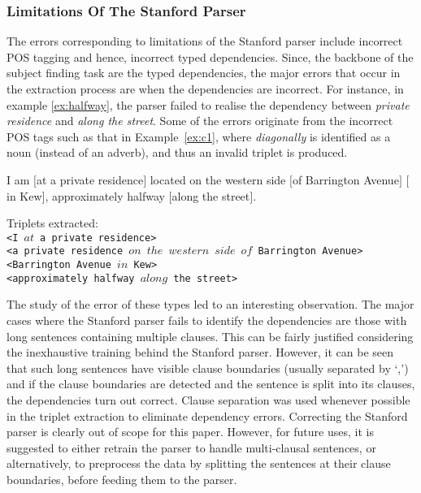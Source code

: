 \documentclass{sig-alternate}
\begin{document}
\subsubsection{Limitations Of The Stanford Parser}
\label{subsub:stanford}
The errors corresponding to limitations of the Stanford parser include incorrect POS tagging and hence, incorrect typed dependencies. Since, the backbone of the subject finding task are the typed dependencies, the major errors that occur in the extraction process are when the dependencies are incorrect. For instance, in example \ref{ex:halfway}, the parser failed to realise the dependency between \textit{private residence} and \textit{along the street}. Some of the errors originate from the incorrect POS tags such as that in Example~\ref{ex:c1}, where \textit{diagonally} is identified as a noun (instead of an adverb), and thus an invalid triplet is produced. \vspace{-0.05in}
\begin{example}
\label{ex:halfway}
I am $[$at a private residence$]$ located on the western side $[$of Barrington Avenue$]$ $[$in Kew$]$, approximately halfway $[$along the street$]$. \vspace{-0.05in}
\end{example}
Triplets extracted:\\
\texttt{<I $at$ a private residence>}\\
\texttt{<a private residence  $on$  $the$ $western$ $side$ $of$ Barrington Avenue>}\\
\texttt{<Barrington Avenue $in$ Kew>}\\
\texttt{<approximately halfway $along$ the street>} \vspace{0.05in}

The study of the error of these types led to an interesting observation. The major cases where the Stanford parser fails to identify the dependencies are those with long sentences containing multiple clauses. This can be fairly justified considering the inexhaustive training behind the Stanford parser. However, it can be seen that such long sentences have visible clause boundaries (usually separated by `,') and if the clause boundaries are detected and the sentence is split into its clauses, the dependencies turn out correct. Clause separation was used whenever possible in the triplet extraction to eliminate dependency errors. Correcting the Stanford parser is clearly out of scope for this paper. However, for future uses, it is suggested to either retrain the parser to handle multi-clausal sentences, or alternatively, to preprocess the data by splitting the sentences at their clause boundaries, before feeding them to the parser.
\end{document}
